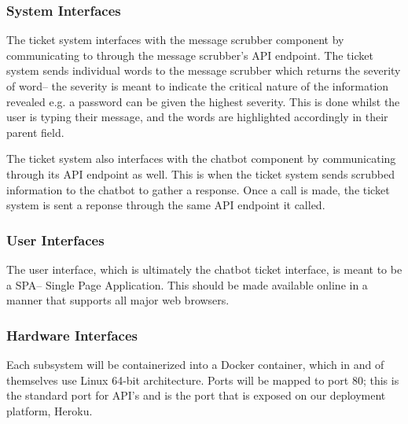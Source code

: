 \documentclass[11pt]{article}
\begin{document}
\subsubsection{System Interfaces}

The ticket system interfaces with the message scrubber component by communicating to through the message scrubber's API endpoint. The ticket system sends individual words to the message scrubber which returns the severity of word-- the severity is meant to indicate the critical nature of the information revealed e.g. a password can be given the highest severity. This is done whilst the user is typing their message, and the words are highlighted accordingly in their parent field.\par

The ticket system also interfaces with the chatbot component by communicating through its API endpoint as well. This is when the ticket system sends scrubbed information to the chatbot to gather a response. Once a call is made, the ticket system is sent a reponse through the same API endpoint it called.

\subsubsection{User Interfaces}

The user interface, which is ultimately the chatbot ticket interface, is meant to be a SPA-- Single Page Application. This should be made available online in a manner that supports all major web browsers.


\subsubsection{Hardware Interfaces}

Each subsystem will be containerized into a Docker container, which in and of themselves use Linux 64-bit architecture. 
Ports will be mapped to port 80; this is the standard port for API's and is the port that is exposed on our deployment platform, Heroku.

\end{document}

